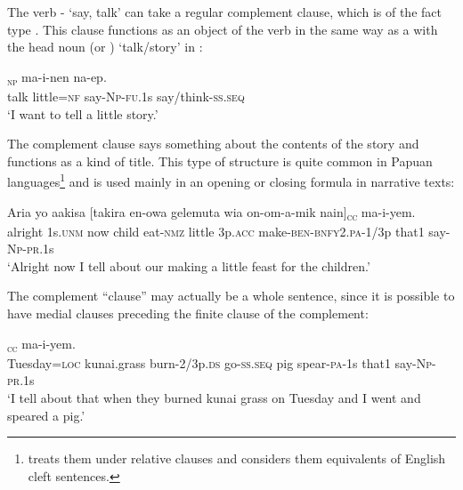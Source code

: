 The verb - `say, talk' can take a regular complement clause, which is of the fact type \citep[389]{Dixon2010b}. This clause functions as an object of the verb in the same way as a  with the head noun  (or ) `talk/story' in :

\ea%
\label{ex:8:x1595}
\gll [Opora  gelemuta=ko]\textsubscript{\textsc{np}}  ma-i-nen  na-ep.\\
talk  little=\textsc{nf} say-\textsc{Np}-\textsc{fu}.1s say/think-\textsc{ss}.\textsc{seq}\\
\glt`I want to tell a little story.'
\z


The complement clause says something about the contents of the story and functions as a kind of title. This type of structure is quite common in Papuan languages\footnote{\citet[231]{Reesink1987} treats them under relative clauses and considers them equivalents of English cleft sentences.} and is used mainly in an opening or closing formula in narrative texts: 

\ea%
\label{ex:8:x1596}
\gll Aria  yo  aakisa  [takira  en-owa  gelemuta  wia on-om-a-mik  nain]\textsubscript{\textsc{cc}} ma-i-yem.\\
alright  1s.\textsc{unm} now  child eat-\textsc{nmz} little 3p.\textsc{acc} make-\textsc{ben}-\textsc{bnfy}2.\textsc{pa}-1/3p  that1 say-\textsc{Np}-\textsc{pr}.1s\\
\glt`Alright now I tell about our making a little feast for the children.'
\z


The complement ``clause'' may actually be a whole sentence, since it is possible to have medial clauses preceding the finite clause of the complement:

\ea%
\label{ex:8:x1597}
\gll [Tunde=pa  fikera  kuum-iwkin  ikiw-ep  waaya mik-a-m  nain]\textsubscript{\textsc{cc}} ma-i-yem.\\
Tuesday=\textsc{loc} kunai.grass burn-2/3p.\textsc{ds} go-\textsc{ss}.\textsc{seq} pig spear-\textsc{pa}-1s that1 say-\textsc{Np}-\textsc{pr}.1s\\
\glt`I tell about that when they burned kunai grass on Tuesday and I went and speared a pig.'
\z


